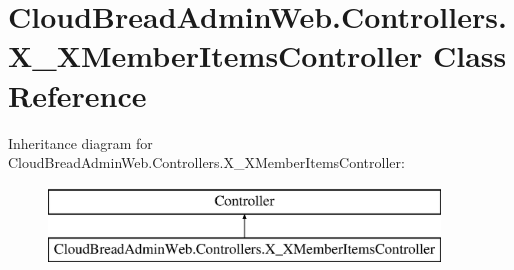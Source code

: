 \hypertarget{a00194}{}\section{Cloud\+Bread\+Admin\+Web.\+Controllers.\+X\+\_\+\+X\+Member\+Items\+Controller Class Reference}
\label{a00194}
Inheritance diagram for Cloud\+Bread\+Admin\+Web.\+Controllers.\+X\+\_\+\+X\+Member\+Items\+Controller\+:\begin{figure}[H]
\begin{center}
\leavevmode
\includegraphics[height=2.000000cm]{a00194}
\end{center}
\end{figure}
